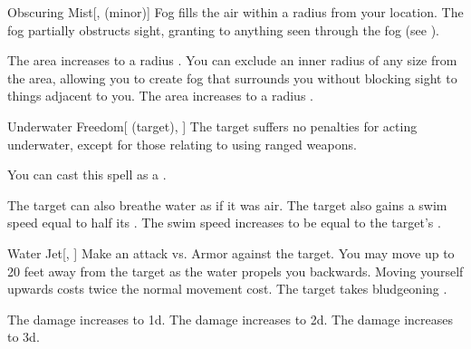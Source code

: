 \lowercase{\hypertarget{spell:Obscuring Mist}{}}\label{spell:Obscuring Mist}
\begin{freeability}[Rank 1]{\hypertarget{spell:Obscuring Mist}{Obscuring Mist}}[,  (minor)]
\targetrule
Fog fills the air within a \areamed radius  from your location.
The fog partially obstructs sight, granting  to anything seen through the fog (see ).

\rankline
{} The area increases to a \arealarge radius .
 You can exclude an inner radius of any size from the area, allowing you to create fog that surrounds you without blocking sight to things adjacent to you.
 The area increases to a \areahuge radius .
\end{freeability}
\vspace{0.25em}



\lowercase{\hypertarget{spell:Underwater Freedom}{}}\label{spell:Underwater Freedom}
\begin{attuneability}[Rank 1]{\hypertarget{spell:Underwater Freedom}{Underwater Freedom}}[ (target), ]
The target suffers no penalties for acting underwater, except for those relating to using ranged weapons.

You can cast this spell as a .

\rankline
{} The target can also breathe water as if it was air.
 The target also gains a swim speed equal to half its .
 The swim speed increases to be equal to the target's .
\end{attuneability}
\vspace{0.25em}



\lowercase{\hypertarget{spell:Water Jet}{}}\label{spell:Water Jet}
\begin{freeability}[Rank 1]{\hypertarget{spell:Water Jet}{Water Jet}}[, ]
Make an attack vs. Armor against the target.
You may move up to 20 feet away from the target as the water propels you backwards.
Moving yourself upwards costs twice the normal movement cost.
\hit The target takes bludgeoning .

\rankline
{} The damage increases to  \plus1d.
 The damage increases to  \plus2d.
 The damage increases to  \plus3d.
\end{freeability}
\vspace{0.25em}



